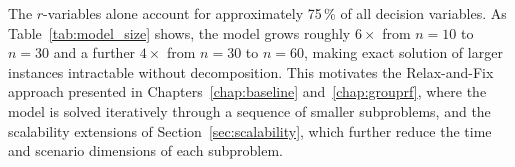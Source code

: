 \noindent The $r$-variables alone account for approximately
75\,\% of all decision variables. As Table~\ref{tab:model_size}
shows, the model grows roughly $6\times$ from $n=10$ to $n=30$
and a further $4\times$ from $n=30$ to $n=60$, making exact
solution of larger instances intractable without decomposition.
This motivates the Relax-and-Fix approach
presented in Chapters~\ref{chap:baseline}
and~\ref{chap:grouprf}, where the model is solved iteratively
through a sequence of smaller subproblems, and the scalability
extensions of Section~\ref{sec:scalability}, which further reduce
the time and scenario dimensions of each subproblem.
